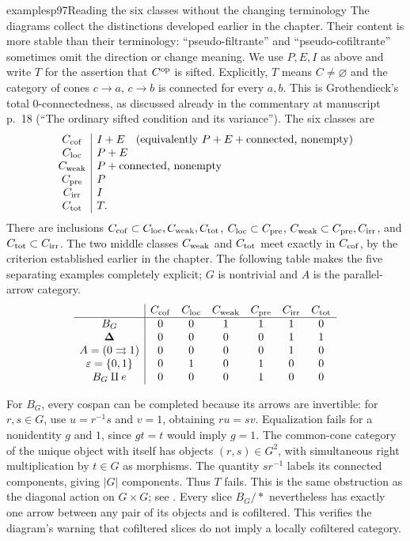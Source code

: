 \begin{dcomment}{examples}{p97}{Reading the six classes without the changing terminology}
The diagrams collect the distinctions developed earlier in the chapter. Their content is more stable than their terminology: ``pseudo-filtrante'' and ``pseudo-cofiltrante'' sometimes omit the direction or change meaning. We use $P,E,I$ as above and write $T$ for the assertion that $C^{\rm op}$ is sifted. Explicitly, $T$ means $C\ne\varnothing$ and the category of cones $c\to a$, $c\to b$ is connected for every $a,b$. This is Grothendieck's total $0$-connectedness, as discussed already in the commentary at manuscript p.~18 (``The ordinary sifted condition and its variance''). The six classes are
\[
\begin{array}{c|l}
C_{\rm cof}&I+E\quad(\text{equivalently }P+E+\text{connected, nonempty})\\
C_{\rm loc}&P+E\\
C_{\rm weak}&P+\text{connected, nonempty}\\
C_{\rm pre}&P\\
C_{\rm irr}&I\\
C_{\rm tot}&T.
\end{array}
\]
There are inclusions $C_{\rm cof}\subset C_{\rm loc},C_{\rm weak},C_{\rm tot}$, $C_{\rm loc}\subset C_{\rm pre}$, $C_{\rm weak}\subset C_{\rm pre},C_{\rm irr}$, and $C_{\rm tot}\subset C_{\rm irr}$. The two middle classes $C_{\rm weak}$ and $C_{\rm tot}$ meet exactly in $C_{\rm cof}$, by the criterion established earlier in the chapter. The following table makes the five separating examples completely explicit; $G$ is nontrivial and $A$ is the parallel-arrow category.
\[
\begin{array}{c|cccccc}
 &C_{\rm cof}&C_{\rm loc}&C_{\rm weak}&C_{\rm pre}&C_{\rm irr}&C_{\rm tot}\\\hline
B_G&0&0&1&1&1&0\\
\boldsymbol\Delta&0&0&0&0&1&1\\
A=(0\rightrightarrows1)&0&0&0&0&1&0\\
\varepsilon=\{0,1\}&0&1&0&1&0&0\\
B_G\amalg e&0&0&0&1&0&0
\end{array}
\]

For $B_G$, every cospan can be completed because its arrows are invertible: for $r,s\in G$, use $u=r^{-1}s$ and $v=1$, obtaining $ru=sv$. Equalization fails for a nonidentity $g$ and $1$, since $gt=t$ would imply $g=1$. The common-cone category of the unique object with itself has objects $(r,s)\in G^2$, with simultaneous right multiplication by $t\in G$ as morphisms. The quantity $sr^{-1}$ labels its connected components, giving $|G|$ components. Thus $T$ fails. This is the same obstruction as the diagonal action on $G\times G$; see \citet[Lemma 4.19.4]{StacksFiltered2026}. Every slice $B_G/*$ nevertheless has exactly one arrow between any pair of its objects and is cofiltered. This verifies the diagram's warning that cofiltered slices do not imply a locally cofiltered category.


\end{dcomment}
